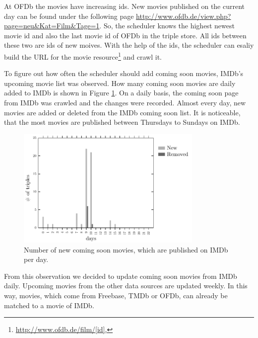 At OFDb the movies have increasing ids.
New movies published on the current day can be found under the following page \url{http://www.ofdb.de/view.php?page=neu&Kat=Film&Tage=1}.
So, the scheduler knows the highest newest movie id and also the last movie id of OFDb in the triple store.
All ids between these two are ids of new moives.
With the help of the ids, the scheduler can esaliy build the URL for the movie resource\footnote{\url{http://www.ofdb.de/film/[id],}} and crawl it.

To figure out how often the scheduler should add coming soon movies, IMDb's upcoming movie list was observed.
How many coming soon movies are daily added to IMDb is shown in Figure \ref{fig_coming_soon_movie}.
On a daily basis, the coming soon page from IMDb was crawled and the changes were recorded.
Almost every day, new movies are added or deleted from the IMDb coming soon list.
It is noticeable, that the most movies are published between Thursdays to Sundays on IMDb.

\begin{figure}[h!]
  \begin{center}
  \includegraphics[width=0.8\textwidth]{images/updating_1.pdf}
  \end{center}
  \caption{Number of new coming soon movies, which are published on IMDb per day.}
  \label{fig_coming_soon_movie}
\end{figure}

From this observation we decided to update coming soon movies from IMDb daily.
Upcoming movies from the other data sources are updated weekly.
In this way, movies, which come from Freebase, TMDb or OFDb, can already be matched to a movie of IMDb.

